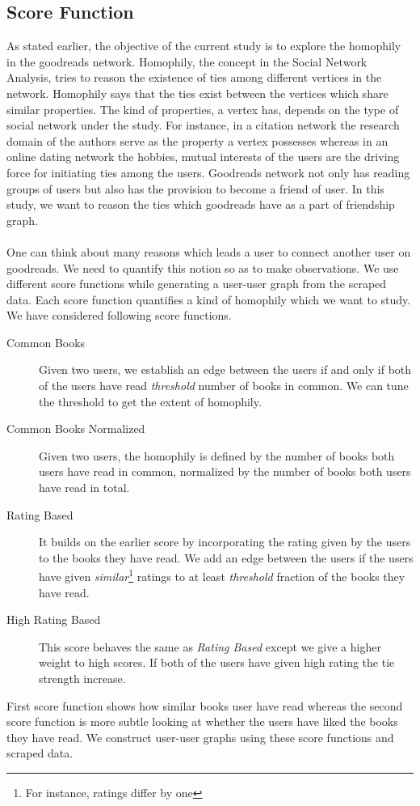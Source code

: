 \documentclass[11pt]{article}
\begin{document}
\subsection{Score Function}
As stated earlier, the objective of the current study is to explore the homophily in the goodreads network. Homophily, the concept in the Social Network Analysis, tries to reason the existence of ties among different vertices in the network. Homophily says that the ties exist between the vertices which share similar properties. The kind of properties, a vertex has, depends on the type of social network under the study. For instance, in a citation network the research domain of the authors serve as the property a vertex possesses whereas in an online dating network the hobbies, mutual interests of the users are the driving force for initiating ties among the users. Goodreads network not only has reading groups of users but also has the provision to become a friend of user. In this study, we want to reason the ties which goodreads have as a part of friendship graph.\\\\
One can think about many reasons which leads a user to connect another user on goodreads. We need to quantify this notion so as to make observations. We use different score functions while generating a user-user graph from the scraped data. Each score function quantifies a kind of homophily which we want to study. We have considered following score functions.
\begin{description}
	\item[Common Books] Given two users, we establish an edge between the users if and only if both of the users have read {\it threshold} number of books in common. We can tune the threshold to get the extent of homophily.
    \item[Common Books Normalized] Given two users, the homophily is defined by the number of books both users have read in common, normalized by the number of books both users have read in total.
    \item[Rating Based]It builds on the earlier score by incorporating the rating given by the users to the books they have read. We add an edge between the users if the users have given {\it similar}\footnote{For instance, ratings differ by one} ratings to at least {\it threshold} fraction of the books they have read.
    \item[High Rating Based] This score behaves the same as \textit{Rating Based} except we give a higher weight to high scores. If both of the users have given high rating the tie strength increase.
\end{description}
First score function shows how similar books user have read whereas the second score function is more subtle looking at whether the users have liked the books they have read. We construct user-user graphs using these score functions and scraped data.
\end{document}
